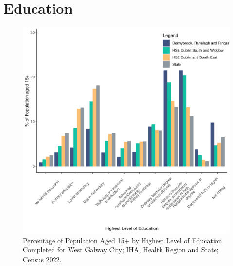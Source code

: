\documentclass{article}
\begin{document}
\section{Education}\label{sect:Edu}
\begin{figure}[H]
	\centering
	\includegraphics[width = 120mm]{../figures/EduED.pdf}
	\caption{Percentage of Population Aged 15+ by Highest Level of Education Completed for West Galway City; IHA, Health Region and State; Census 2022.}
	\label{fig:vbnv}
	\end{figure}
\end{document}
